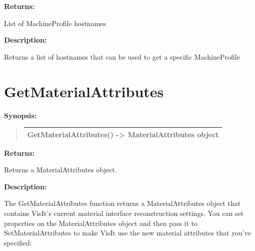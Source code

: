 \documentclass[letterpaper,10pt,english]{sphinxmanual}
\begin{document}
\begin{DUlineblock}{0em}
\item[] 
\item[] \textbf{Returns:}
\item[] List of MachineProfile hostnames
\item[] 
\item[] \textbf{Description:}
\item[] Returns a list of hostnames that can be used to get a specific MachineProfile
\end{DUlineblock}

\begin{DUlineblock}{0em}
\item[] 
\end{DUlineblock}


\section{GetMaterialAttributes}
\label{functions:getmaterialattributes}
\begin{DUlineblock}{0em}
\item[] \textbf{Synopsis:}
\end{DUlineblock}
\begin{quote}

\begin{tabulary}{\linewidth}{|L|}
\hline

GetMaterialAttributes() -\textgreater{} MaterialAttributes object
\\
\hline\end{tabulary}

\end{quote}

\begin{DUlineblock}{0em}
\item[] 
\item[] \textbf{Returns:}
\item[] Returns a MaterialAttributes object.
\item[] 
\item[] \textbf{Description:}
\item[] The GetMaterialAttributes function returns a MaterialAttributes object
that contains VisIt's current material interface reconstruction settings.
You can set properties on the MaterialAttributes object and then pass it to
SetMaterialAttributes to make VisIt use the new material attributes that
you've specified:
\end{DUlineblock}
\end{document}
